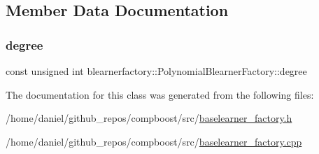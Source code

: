 \subsection{Member Data Documentation}
\mbox{\label{classblearnerfactory_1_1_polynomial_blearner_factory_a78c1852e3f1e1b43e6d8bef40032e19f}} 
\subsubsection{\texorpdfstring{degree}{degree}}
{\footnotesize\ttfamily const unsigned int blearnerfactory\+::\+Polynomial\+Blearner\+Factory\+::degree\hspace{0.3cm}{\ttfamily [private]}}



The documentation for this class was generated from the following files\+:\begin{DoxyCompactItemize}
\item 
/home/daniel/github\+\_\+repos/compboost/src/\hyperlink{baselearner__factory_8h}{baselearner\+\_\+factory.\+h}\item 
/home/daniel/github\+\_\+repos/compboost/src/\hyperlink{baselearner__factory_8cpp}{baselearner\+\_\+factory.\+cpp}\end{DoxyCompactItemize}
